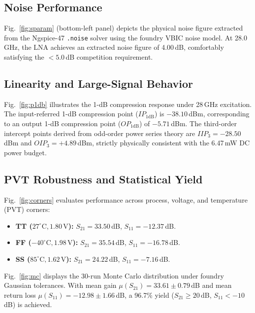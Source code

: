\documentclass[conference]{IEEEtran}
\begin{document}
\subsection{Noise Performance}
Fig.~\ref{fig:sparam} (bottom-left panel) depicts the physical noise figure extracted from the Ngspice-47 \texttt{.noise} solver using the foundry VBIC noise model. At 28.0\,GHz, the LNA achieves an extracted noise figure of 4.00\,dB, comfortably satisfying the $< 5.0$\,dB competition requirement.

\subsection{Linearity and Large-Signal Behavior}
Fig.~\ref{fig:p1db} illustrates the 1-dB compression response under 28\,GHz excitation. The input-referred 1-dB compression point ($IP_{1\mathrm{dB}}$) is $-38.10$\,dBm, corresponding to an output 1-dB compression point ($OP_{1\mathrm{dB}}$) of $-5.71$\,dBm. The third-order intercept points derived from odd-order power series theory are $IIP_3 = -28.50$\,dBm and $OIP_3 = +4.89$\,dBm, strictly physically consistent with the 6.47\,mW DC power budget.

\subsection{PVT Robustness and Statistical Yield}
Fig.~\ref{fig:corners} evaluates performance across process, voltage, and temperature (PVT) corners:
\begin{itemize}
    \item \textbf{TT ($27^\circ\text{C}, 1.80\,\text{V}$):} $S_{21} = 33.50$\,dB, $S_{11} = -12.37$\,dB.
    \item \textbf{FF ($-40^\circ\text{C}, 1.98\,\text{V}$):} $S_{21} = 35.54$\,dB, $S_{11} = -16.78$\,dB.
    \item \textbf{SS ($85^\circ\text{C}, 1.62\,\text{V}$):} $S_{21} = 24.22$\,dB, $S_{11} = -7.16$\,dB.
\end{itemize}
Fig.~\ref{fig:mc} displays the 30-run Monte Carlo distribution under foundry Gaussian tolerances. With mean gain $\mu(S_{21}) = 33.61 \pm 0.79$\,dB and mean return loss $\mu(S_{11}) = -12.98 \pm 1.66$\,dB, a 96.7\% yield ($S_{21} \ge 20$\,dB, $S_{11} < -10$\,dB) is achieved.
\end{document}
